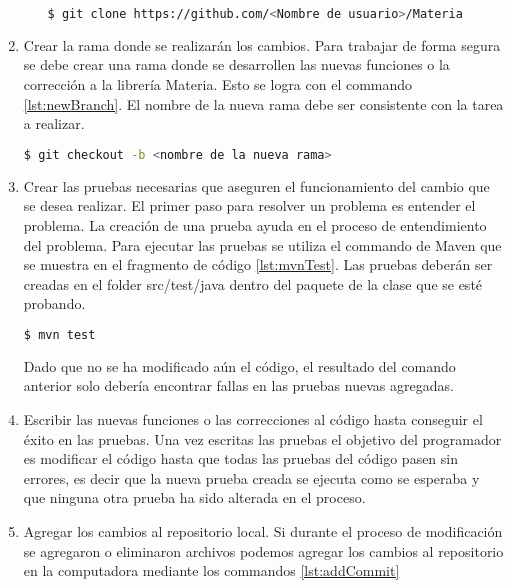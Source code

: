 \begin{enumerate}
\begin{itemize}
\begin{lstlisting}[label={lst:cloneCommand},caption={Commando para clonar el repositorio de GitHub},language=bash]
	$ git clone https://github.com/<Nombre de usuario>/Materia
\end{lstlisting}

			\end{itemize}

		\item Crear la rama donde se realizarán los cambios. Para trabajar de forma segura se debe crear una rama donde se desarrollen las nuevas funciones o la corrección a la librería Materia. Esto se logra con el commando \ref{lst:newBranch}. El nombre de la nueva rama debe ser consistente con la tarea a realizar.
		\begin{lstlisting}[label={lst:newBranch},caption={Commando para crear una nueva rama en el repositorio.},language=bash]
			$ git checkout -b <nombre de la nueva rama>
		\end{lstlisting}

		\item Crear las pruebas necesarias que aseguren el funcionamiento del cambio que se desea realizar. El primer paso para resolver un problema es entender el problema. La creación de una prueba ayuda en el proceso de entendimiento del problema. Para ejecutar las pruebas se utiliza el commando de Maven que se muestra en el fragmento de código \ref{lst:mvnTest}. Las pruebas deberán ser creadas en el folder src/test/java dentro del paquete de la clase que se esté probando.

\begin{lstlisting}[caption={Para ejecutar las pruebas del proyecto},label={lst:mvnTest},language=bash]
	$ mvn test
\end{lstlisting}

		Dado que no se ha modificado aún el código, el resultado del comando anterior solo debería encontrar fallas en las pruebas nuevas agregadas.

		\item Escribir las nuevas funciones o las correcciones al código hasta conseguir el éxito en las pruebas. Una vez escritas las pruebas el objetivo del programador es modificar el código hasta que todas las pruebas del código pasen sin errores, es decir que la nueva prueba creada se ejecuta como se esperaba y que ninguna otra prueba ha sido alterada en el proceso.

		\item Agregar los cambios al repositorio local. Si durante el proceso de modificación se agregaron o eliminaron archivos podemos agregar los cambios al repositorio en la computadora mediante los commandos \ref{lst:addCommit}


\end{enumerate}
